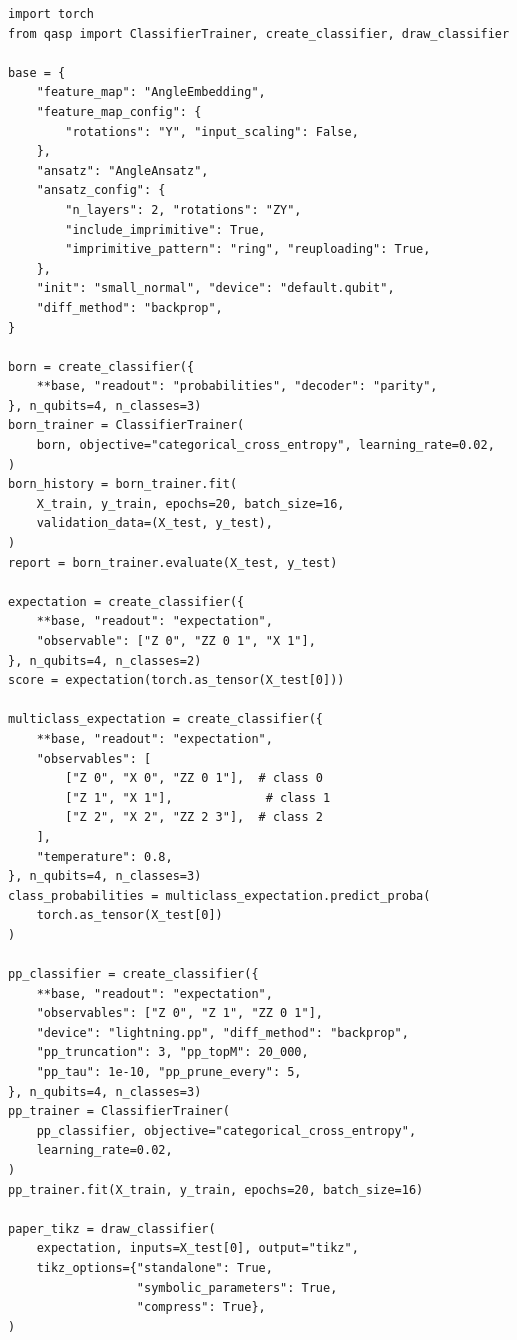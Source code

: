 \documentclass[10pt]{article}
\begin{document}
\begin{lstlisting}[caption={Probability and expectation classifiers built from the same QASP circuit notation.},label={lst:classifiers}]
import torch
from qasp import ClassifierTrainer, create_classifier, draw_classifier

base = {
    "feature_map": "AngleEmbedding",
    "feature_map_config": {
        "rotations": "Y", "input_scaling": False,
    },
    "ansatz": "AngleAnsatz",
    "ansatz_config": {
        "n_layers": 2, "rotations": "ZY",
        "include_imprimitive": True,
        "imprimitive_pattern": "ring", "reuploading": True,
    },
    "init": "small_normal", "device": "default.qubit",
    "diff_method": "backprop",
}

born = create_classifier({
    **base, "readout": "probabilities", "decoder": "parity",
}, n_qubits=4, n_classes=3)
born_trainer = ClassifierTrainer(
    born, objective="categorical_cross_entropy", learning_rate=0.02,
)
born_history = born_trainer.fit(
    X_train, y_train, epochs=20, batch_size=16,
    validation_data=(X_test, y_test),
)
report = born_trainer.evaluate(X_test, y_test)

expectation = create_classifier({
    **base, "readout": "expectation",
    "observable": ["Z 0", "ZZ 0 1", "X 1"],
}, n_qubits=4, n_classes=2)
score = expectation(torch.as_tensor(X_test[0]))

multiclass_expectation = create_classifier({
    **base, "readout": "expectation",
    "observables": [
        ["Z 0", "X 0", "ZZ 0 1"],  # class 0
        ["Z 1", "X 1"],             # class 1
        ["Z 2", "X 2", "ZZ 2 3"],  # class 2
    ],
    "temperature": 0.8,
}, n_qubits=4, n_classes=3)
class_probabilities = multiclass_expectation.predict_proba(
    torch.as_tensor(X_test[0])
)

pp_classifier = create_classifier({
    **base, "readout": "expectation",
    "observables": ["Z 0", "Z 1", "ZZ 0 1"],
    "device": "lightning.pp", "diff_method": "backprop",
    "pp_truncation": 3, "pp_topM": 20_000,
    "pp_tau": 1e-10, "pp_prune_every": 5,
}, n_qubits=4, n_classes=3)
pp_trainer = ClassifierTrainer(
    pp_classifier, objective="categorical_cross_entropy",
    learning_rate=0.02,
)
pp_trainer.fit(X_train, y_train, epochs=20, batch_size=16)

paper_tikz = draw_classifier(
    expectation, inputs=X_test[0], output="tikz",
    tikz_options={"standalone": True,
                  "symbolic_parameters": True,
                  "compress": True},
)
\end{lstlisting}
\end{document}
